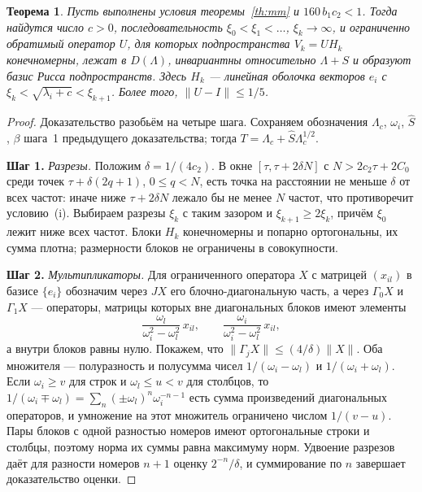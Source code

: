 \documentclass[12pt,a4paper]{article}
\newtheorem{theorem}{Теорема}
\theoremstyle{definition}
\newcommand{\step}[1]{\smallskip\noindent\textbf{Шаг #1.}}
\newcommand{\norm}[1]{\lVert#1\rVert}
\begin{document}
\begin{theorem}\label{th:small}
Пусть выполнены условия теоремы~\ref{th:mm} и $160\,b_1c_2<1$. Тогда найдутся число
$c>0$, последовательность $\xi_0<\xi_1<\dots$, $\xi_k\to\infty$, и ограниченно обратимый
оператор $U$, для которых подпространства $V_k=UH_k$ конечномерны, лежат в $D(\Lambda)$,
инвариантны относительно $\Lambda+S$ и образуют базис Рисса подпространств. Здесь $H_k$
--- линейная оболочка векторов $e_i$ с $\xi_k<\sqrt{\lambda_i+c}<\xi_{k+1}$. Более того,
$\norm{U-I}\le1/5$.
\end{theorem}
\begin{proof}
Доказательство разобьём на четыре шага. Сохраняем обозначения $\Lambda_c$, $\omega_i$,
$\hat S$, $\beta$ шага~1 предыдущего доказательства; тогда
$T=\Lambda_c+\hat S\Lambda_c^{1/2}$.

\step{1} \emph{Разрезы.} Положим $\delta=1/(4c_2)$. В окне $[\tau,\tau+2\delta N]$ с
$N>2c_2\tau+2C_0$ среди точек $\tau+\delta(2q+1)$, $0\le q<N$, есть точка на расстоянии
не меньше $\delta$ от всех частот: иначе ниже $\tau+2\delta N$ лежало бы не менее $N$
частот, что противоречит условию~(i). Выбираем разрезы $\xi_k$ с таким зазором и
$\xi_{k+1}\ge2\xi_k$, причём $\xi_0$ лежит ниже всех частот. Блоки $H_k$ конечномерны и
попарно ортогональны, их сумма плотна; размерности блоков не ограничены в совокупности.

\step{2} \emph{Мультипликаторы.} Для ограниченного оператора $X$ с матрицей $(x_{il})$ в
базисе $\{e_i\}$ обозначим через $JX$ его блочно-диагональную часть, а через
$\Gamma_0X$ и $\Gamma_1X$ --- операторы, матрицы которых вне диагональных блоков имеют
элементы
\[
 \frac{\omega_l}{\omega_i^2-\omega_l^2}\,x_{il},\qquad
 \frac{\omega_i}{\omega_i^2-\omega_l^2}\,x_{il},
\]
а внутри блоков равны нулю. Покажем, что $\norm{\Gamma_jX}\le(4/\delta)\norm X$. Оба
множителя --- полуразность и полусумма чисел $1/(\omega_i-\omega_l)$ и
$1/(\omega_i+\omega_l)$. Если $\omega_i\ge v$ для строк и $\omega_l\le u<v$ для столбцов,
то $1/(\omega_i\mp\omega_l)=\sum_n(\pm\omega_l)^n\omega_i^{-n-1}$ есть сумма произведений
диагональных операторов, и умножение на этот множитель ограничено числом $1/(v-u)$. Пары
блоков с одной разностью номеров имеют ортогональные строки и столбцы, поэтому норма их
суммы равна максимуму норм. Удвоение разрезов даёт для разности номеров $n+1$ оценку
$2^{-n}/\delta$, и суммирование по $n$ завершает доказательство оценки.


\end{proof}
\end{document}
